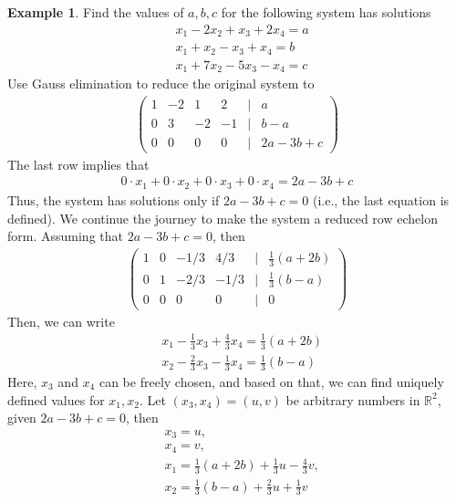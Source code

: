 \documentclass[10pt,a4paper]{book}
\theoremstyle{definition}\newtheorem{definition}{Definition}
\theoremstyle{definition}\newtheorem{fact}{Fact}
\theoremstyle{definition}\newtheorem{ex}{Ex.}
\theoremstyle{definition}\newtheorem{project}{Project}
\theoremstyle{definition}\newtheorem{problem}{Problem}
\theoremstyle{definition}\newtheorem{example}{Example}
\numberwithin{theorem}{chapter}
\numberwithin{corollary}{chapter}
\numberwithin{assumption}{chapter}
\numberwithin{definition}{chapter}
\numberwithin{prop}{chapter}
\numberwithin{notation}{chapter}
\numberwithin{problem}{chapter}
\numberwithin{example}{chapter}
\numberwithin{fact}{chapter}
\numberwithin{ex}{chapter}
\def\R{\mathbb R}
\def\R{\mathbb R}
\begin{document}
	\begin{example}
		Find the values of $a,b,c$ for the following system has solutions
		\begin{align*}
			&x_1 - 2x_2 + x_3 + 2x_4 = a \\
			&x_1 + x_2 - x_3 + x_4 = b \\
			&x_1 + 7 x_2 - 5 x_3 - x_4 = c
		\end{align*}
		Use Gauss elimination to reduce the original system to
		\begin{align*}
			\begin{pmatrix}
				1 & -2 & 1 & 2 & | & a \\
				0 & 3 & -2 & -1 & | & b-a \\
				0 & 0 & 0 & 0 & | & 2a - 3b + c
			\end{pmatrix}
		\end{align*}
		The last row implies that
		\begin{align*}
			0 \cdot x_1 + 0 \cdot x_2 + 0 \cdot x_3 + 0\cdot x_4 = 2a - 3b + c
		\end{align*}
		Thus, the system has solutions only if $2a - 3b +c = 0$ (i.e., the last equation is defined). We continue the journey to make the system a reduced row echelon form. Assuming that $2a - 3b +c = 0$, then
		\begin{align*}
			\begin{pmatrix}
				1 & 0 & -1/3 & 4/3 & | & \frac{1}{3} (a+2b) \\
				0 & 1 & -2/3 & -1/3 & | & \frac{1}{3}(b-a) \\
				0 & 0 & 0 & 0 & | & 0
			\end{pmatrix}
		\end{align*}
		Then, we can write
		\begin{align*}
			&x_1   - \frac{1}{3} x_3 + \frac{4}{3} x_4 = \frac{1}{3} (a+2b) \\
			&   x_2 - \frac{2}{3} x_3 - \frac{1}{3} x_4 = \frac{1}{3} (b-a) 
		\end{align*}
		Here, $x_3$ and $x_4$ can be freely chosen, and based on that, we can find uniquely defined values for $x_1, x_2$. Let $(x_3, x_4) = (u, v)$ be arbitrary numbers in $\R^2$, given $2a - 3b +c = 0$, then
		\begin{align*}
			&x_3 = u, \\
			&x_4 = v, \\
			&x_1 = \frac{1}{3}(a+2b) + \frac{1}{3}u - \frac{4}{3}v, \\
			&x_2 = \frac{1}{3}(b-a) + \frac{2}{3}u + \frac{1}{3}v
		\end{align*}
	\end{example}
	
\end{document}
